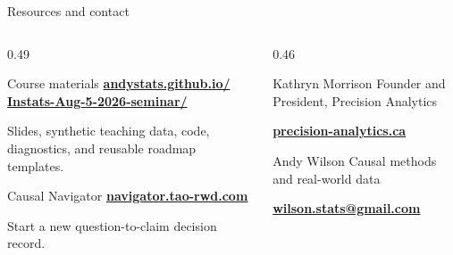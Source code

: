 \documentclass[aspectratio=169,10pt]{beamer}
\begin{document}
\begin{frame}[t]{Resources and contact}
  \vspace*{0.28cm}
  \begin{columns}[T,onlytextwidth]
    \begin{column}{0.49\textwidth}
      \begin{block}{Course materials}
        \href{https://andystats.github.io/Instats-Aug-5-2026-seminar/}
          {\color{accent}\bfseries
           andystats.github.io/\\
           Instats-Aug-5-2026-seminar/}

        \vspace{0.20cm}
        \small Slides, synthetic teaching data, code, diagnostics, and reusable
        roadmap templates.
      \end{block}

      \vspace{0.22cm}
      \begin{block}{Causal Navigator}
        \href{https://navigator.tao-rwd.com/}
          {\color{accent}\bfseries navigator.tao-rwd.com}

        \vspace{0.20cm}
        \small Start a new question-to-claim decision record.
      \end{block}
    \end{column}

    \begin{column}{0.46\textwidth}
      \begin{block}{Kathryn Morrison}
        Founder and President, Precision Analytics

        \vspace{0.18cm}
        \href{https://www.precision-analytics.ca/}
          {\color{accent}\bfseries precision-analytics.ca}
      \end{block}

      \vspace{0.22cm}
      \begin{block}{Andy Wilson}
        Causal methods and real-world data

        \vspace{0.18cm}
        \href{mailto:wilson.stats@gmail.com}
          {\color{accent}\bfseries wilson.stats@gmail.com}
      \end{block}
    \end{column}
  \end{columns}
\end{frame}
\end{document}
